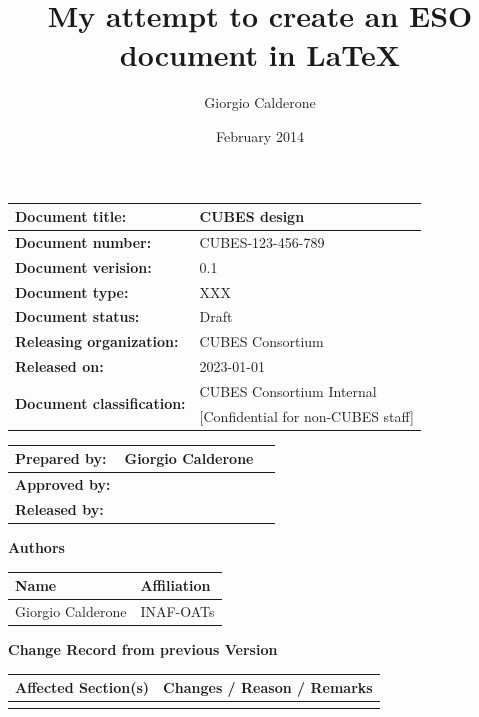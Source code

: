 \documentclass[12pt,a4paper]{report}
\title{My attempt to create an ESO document in \LaTeX}
\author{Giorgio Calderone}
\date{February 2014}
\begin{document}
\begin{tabular}{ |p{6cm}|p{8cm}| }
  \hline
      {\bf Document title:}          & {\bf CUBES design}                       \\ \hline
      {\bf Document number:}         & CUBES-123-456-789                        \\ \hline
      {\bf Document verision:}       & 0.1                                      \\ \hline
      {\bf Document type:}           & XXX                                      \\ \hline
      {\bf Document status:}         & Draft                                    \\ \hline
      {\bf Releasing organization:}  & CUBES Consortium                         \\ \hline
      {\bf Released on:}             & 2023-01-01                               \\ \hline
      \multirow{2}{*}{\bf Document classification:} & CUBES Consortium Internal \\
                                     & [Confidential for non-CUBES staff]       \\ \hline
\end{tabular}

\bigskip

\begin{tabular}{ |p{3cm}|p{5cm}|p{5cm}| }
  \hline
      {\bf Prepared by:}  &  Giorgio Calderone & \\ \hline
      {\bf Approved by:}  &                    & \\ \hline
      {\bf Released by:}  &                    & \\ \hline
\end{tabular}


\newpage




{\Large \bf Authors}
\medskip

\begin{tabular}{ |p{6cm}|p{8cm}| }
  \hline
      {\bf Name} & {\bf Affiliation}\\
      \hline
      Giorgio Calderone & INAF-OATs\\
      \hline
\end{tabular}

\bigskip

{\Large \bf Change Record from previous Version}
\medskip

\begin{tabular}{ |p{6cm}|p{8cm}| }
  \hline
      {\bf Affected Section(s)} & {\bf Changes / Reason / Remarks}\\
      \hline
       & \\
      \hline
\end{tabular}
\end{document}
